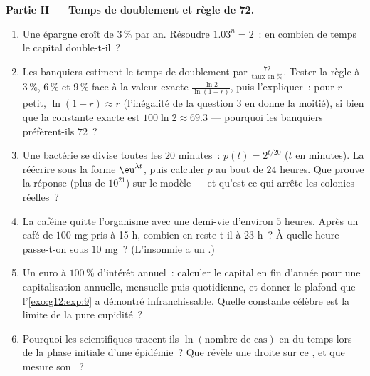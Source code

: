 \begin{problem}
\medskip
\noindent\textbf{Partie II --- Temps de doublement et règle de
72.}
\begin{enumerate}[resume]
  \item Une épargne croît de $3\,\%$ par an. Résoudre
        $1.03^n = 2$~: en combien de temps le capital
        double-t-il~?
  \item Les banquiers estiment le temps de doublement par
        $\frac{72}{\text{taux en }\%}$. Tester la règle à $3\,\%$,
        $6\,\%$ et $9\,\%$ face à la valeur exacte
        $\frac{\ln 2}{\ln(1 + r)}$, puis l'expliquer~: pour $r$
        petit, $\ln(1 + r) \approx r$ (l'inégalité de la question 3
        en donne la moitié), si bien que la constante exacte est
        $100 \ln 2 \approx 69.3$ --- pourquoi les banquiers
        préfèrent-ils $72$~?
  \item Une bactérie se divise toutes les $20$ minutes~:
        $p(t) = 2^{t/20}$ ($t$ en minutes). La réécrire sous la
        forme $\eu^{\lambda t}$, puis calculer $p$ au bout de $24$
        heures. Que prouve la réponse (plus de $10^{21}$) sur le
        modèle --- et qu'est-ce qui arrête les colonies réelles~?
  \item La caféine quitte l'organisme avec une demi-vie d'environ
        $5$ heures. Après un café de $100$ mg pris à 15 h, combien
        en reste-t-il à 23 h~? À quelle heure passe-t-on sous
        $10$ mg~? (L'insomnie a un .)
  \item Un euro à $100\,\%$ d'intérêt annuel~: calculer le capital
        en fin d'année pour une capitalisation annuelle, mensuelle
        puis quotidienne, et donner le plafond que
        l'\cref{exo:g12:exp:9} a démontré infranchissable. Quelle
        constante célèbre est la limite de la pure cupidité~?
  \item Pourquoi les scientifiques tracent-ils
        $\ln(\text{nombre de cas})$ en  du temps lors de la
        phase initiale d'une épidémie~? Que révèle une droite sur ce
        , et que mesure son ~?
\end{enumerate}


\end{problem}
